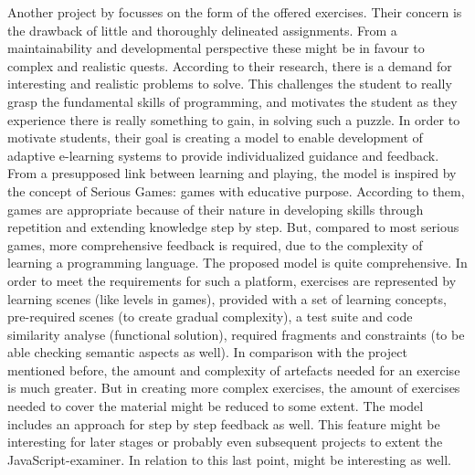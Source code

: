 \documentclass{article}
\begin{document}
Another project by 
\citep{watson2011learning}
focusses on the form of the offered exercises. Their concern is the 
drawback of little and  thoroughly delineated assignments. From a
maintainability and developmental perspective these might be in favour 
to complex and realistic quests. According to their research, there is a demand
for interesting and realistic problems to solve. This challenges the student to
really grasp the fundamental skills of programming, and motivates the student as
they experience there is really something to gain, in solving such a puzzle.
In order to motivate students, their goal is creating a model to enable 
development of adaptive e-learning systems to provide individualized guidance 
and feedback. From a presupposed link between learning and playing, the model
is inspired by the concept of Serious Games: games with educative purpose. 
According to them, games are appropriate because of their nature in developing
skills through repetition and extending knowledge step by step. But, 
compared to most serious games, more comprehensive feedback is 
required, due to the complexity of learning a programming language. The proposed
model is quite comprehensive.
In order to meet the requirements for such a platform, exercises are 
represented by learning scenes (like levels in
games), provided with a set of learning concepts, pre-required scenes (to
create
gradual complexity), a test suite and code similarity analyse (functional 
solution),
required fragments and constraints (to be able checking
semantic aspects as well). In comparison with the 
project mentioned before, the amount and complexity of artefacts needed
for an exercise is
much greater. But in creating more complex exercises, the amount of exercises 
needed to cover the material might be reduced to some extent. The model includes 
an approach for step by step feedback as well. This feature might be interesting 
for later stages or probably even subsequent projects to extent the 
JavaScript-examiner. In relation to this last point, 
\citep{burckhardt2013s}
might be interesting as well.
\end{document}
